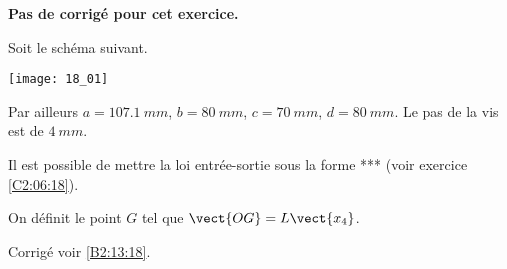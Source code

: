\normalfalse \difficilefalse \tdifficiletrue
\correctionfalse


\setcounter{question}{0}
\ifcorrection
\else
\textbf{Pas de corrigé pour cet exercice.}
\fi

\ifprof
\else

Soit le schéma suivant. 
\begin{center}
\texttt{[image: 18\_01]}
\end{center}
\fi

Par ailleurs $a=\SI{107,1}{mm}$, $b=\SI{80}{mm}$, $c=\SI{70}{mm}$, $d=\SI{80}{mm}$. Le pas de la vis est de $\SI{4}{mm}$.


Il est possible de mettre la loi entrée-sortie sous la forme *** (voir exercice \ref{C2:06:18}).

On définit le point $G$ tel que $\vect{OG}=L\vect{x_4}$.

\ifprof
\else
\fi

\ifprof
\else
\fi


\ifprof
\else
\begin{flushright}
\footnotesize{Corrigé  voir \ref{B2:13:18}.}
\end{flushright}%
\fi